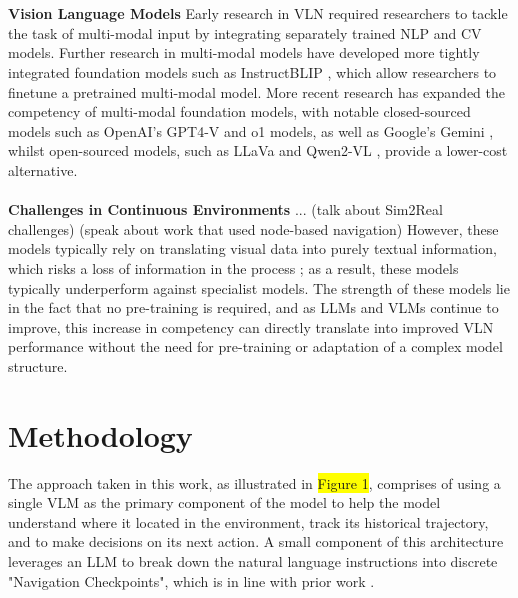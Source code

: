 \documentclass{svproc}
\begin{document}
    \\ \\
    \textbf{Vision Language Models}  Early research in VLN required researchers to tackle the task of multi-modal input by integrating separately trained NLP and CV models. Further research in multi-modal models have developed more tightly integrated foundation models such as InstructBLIP \cite{dai2023instructblipgeneralpurposevisionlanguagemodels}, which allow researchers to finetune a pretrained multi-modal model. More recent research has expanded the competency of multi-modal foundation models, with notable closed-sourced models such as OpenAI's GPT4-V \cite{openai2024gpt4technicalreport} and o1 \cite{openai_o1} models, as well as Google's Gemini \cite{geminiteam2024geminifamilyhighlycapable}, whilst open-sourced models, such as LLaVa \cite{liu2023visualinstructiontuning} and Qwen2-VL \cite{Qwen2VL}, provide a lower-cost alternative. 
    \\ \\
    \textbf{Challenges in Continuous Environments}  
     ... (talk about Sim2Real challenges) (speak about work that used node-based navigation)
    \newline
    However, these models typically rely on translating visual data into purely textual information, which risks a loss of information in the process \cite{pan2024langnavlanguageperceptualrepresentation}; as a result, these models typically underperform against specialist models. The strength of these models lie in the fact that no pre-training is required, and as LLMs and VLMs continue to improve, this increase in competency can directly translate into improved VLN performance without the need for pre-training or adaptation of a complex model structure.

\section{Methodology}
    The approach taken in this work, as illustrated in \colorbox{yellow}{Figure 1}, comprises of using a single VLM as the primary component of the model to help the model understand where it located in the environment, track its historical trajectory, and to make decisions on its next action. A small component of this architecture leverages an LLM to break down the natural language instructions into discrete "Navigation Checkpoints", which is in line with prior work \cite{ chen-etal-2024-mapgpt, pan2024langnavlanguageperceptualrepresentation, zhou2023navgptexplicitreasoningvisionandlanguage}.
    
\end{document}
